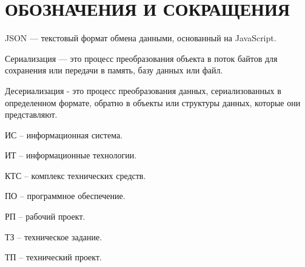 \section*{ОБОЗНАЧЕНИЯ И СОКРАЩЕНИЯ}

JSON — текстовый формат обмена данными, основанный на JavaScript.

Сериализация — это процесс преобразования объекта в поток байтов для сохранения или передачи в память, базу данных или файл.

Десериализация - это процесс преобразования данных, сериализованных в определенном формате, обратно в объекты или структуры данных, которые они представляют.

ИС -- информационная система.

ИТ -- информационные технологии. 

КТС -- комплекс технических средств.

ПО -- программное обеспечение.

РП -- рабочий проект.

ТЗ -- техническое задание.

ТП -- технический проект.